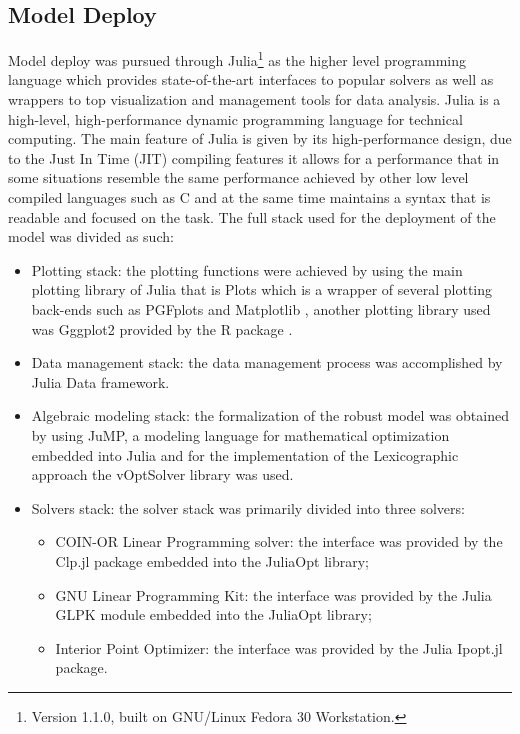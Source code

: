 \documentclass[conference,final,]{IEEEtran}
\begin{document}
\hypertarget{model-deploy}{%
  \subsection{Model Deploy}\label{model-deploy}}
Model deploy was pursued through Julia\footnote{Version 1.1.0, built on GNU/Linux Fedora 30 Workstation.} as the higher level programming language which provides state-of-the-art interfaces to popular solvers as well as wrappers to top visualization and management tools for data analysis. Julia is a high-level, high-performance dynamic programming language for technical computing. The main feature of Julia is given by its high-performance design, due to the Just In Time (JIT) compiling features it allows for a performance that in some situations resemble the same performance achieved by other low level compiled languages such as C and at the same time maintains a syntax that is readable and focused on the task. The full stack used for the deployment of the model was divided as such:
\begin{itemize}
\item Plotting stack: the plotting functions were achieved by using the main plotting library of Julia that is Plots \cite{plots18} which is a wrapper of several plotting back-ends such as PGFplots and Matplotlib \cite{matplotlib07}, another plotting library used was Gggplot2 \cite{ggplot206} provided by the R package \cite{r18}.
\item Data management stack: the data management process was accomplished by Julia Data framework.
\item Algebraic modeling stack: the formalization of the robust model was obtained by using JuMP, a modeling language for mathematical optimization embedded into Julia and for the implementation of the Lexicographic approach the vOptSolver\cite{xavier17} library was used.
\item Solvers stack: the solver stack was primarily divided into three solvers:
  \begin{itemize}
  \item COIN-OR Linear Programming solver: the interface was provided by the Clp.jl package embedded into the JuliaOpt library;
  \item GNU Linear Programming Kit: the interface was provided by the Julia GLPK module embedded into the JuliaOpt library;
  \item Interior Point Optimizer: the interface was provided by the Julia Ipopt.jl package.
  \end{itemize}
\end{itemize}
\end{document}
